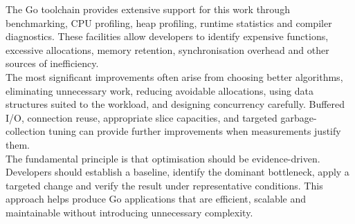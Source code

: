 The Go toolchain provides extensive support for this work through benchmarking, CPU profiling, heap profiling, runtime statistics and compiler diagnostics. These facilities allow developers to identify expensive functions, excessive allocations, memory retention, synchronisation overhead and other sources of inefficiency.\\

The most significant improvements often arise from choosing better algorithms, eliminating unnecessary work, reducing avoidable allocations, using data structures suited to the workload, and designing concurrency carefully. Buffered I/O, connection reuse, appropriate slice capacities, and targeted garbage-collection tuning can provide further improvements when measurements justify them.\\

The fundamental principle is that optimisation should be evidence-driven. Developers should establish a baseline, identify the dominant bottleneck, apply a targeted change and verify the result under representative conditions. This approach helps produce Go applications that are efficient, scalable and maintainable without introducing unnecessary complexity.\\